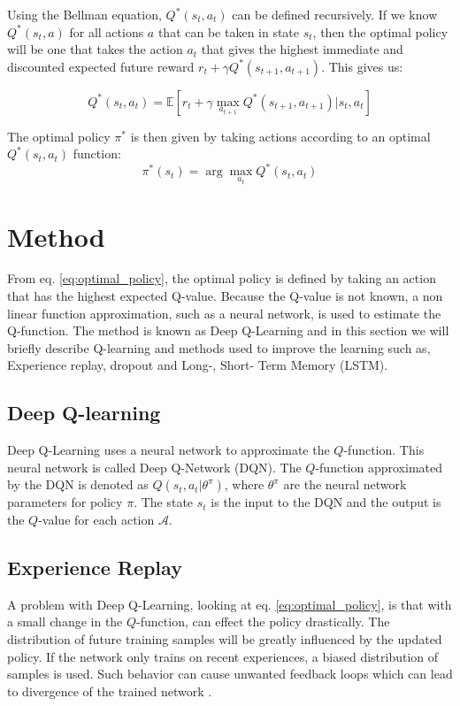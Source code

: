 Using the Bellman equation, $Q^*(s_t, a_t)$ can be defined recursively. If we know $Q^*(s_t, a)$ for all actions $a$ that can be taken in state $s_t$, then the optimal policy will be one that takes the action $a_{t}$ that gives the highest immediate and discounted expected future reward $r_t + \gamma Q^*(s_{t+1}, a_{t+1})$. This gives us: 

\begin{equation}
Q^*(s_t,a_t)= \mathbb{E}[r_t + \gamma \max_{a_{t+1}} Q^*(s_{t+1}, a_{t+1})| s_t, a_t]
\label{eq:q-function}
\end{equation}

The optimal policy $\pi^*$ is then given by taking actions according to an optimal $Q^*(s_t,a_t)$ function: 
\begin{equation}
\pi^*(s_t) = \arg\max_{a_t} Q^*(s_t,a_t)
\label{eq:optimal_policy}
\end{equation}

\section{Method}
\label{sec:method}
From eq. \ref{eq:optimal_policy}, the optimal policy is defined by taking an action that has the highest expected Q-value. Because the Q-value is not known, a non linear function approximation, such as a neural network, is used to estimate the Q-function. The method is known as Deep Q-Learning \cite{Mnih2015} and in this section we will briefly describe Q-learning and methods used to improve the learning such as, Experience replay, dropout and Long-, Short- Term Memory (LSTM).

\subsection{Deep Q-learning}
\label{sec:dqn}
Deep Q-Learning uses a neural network to approximate the $Q$-function. This neural network is called Deep Q-Network (DQN). The $Q$-function approximated by the DQN is denoted as $Q(s_t,a_t|\theta^\pi)$, where $\theta^\pi$ are the neural network parameters for policy $\pi$. The state $s_t$ is the input to the DQN and the output is the $Q$-value for each action $\mathcal{A}$.

\subsection{Experience Replay}
A problem with Deep Q-Learning, looking at eq. \ref{eq:optimal_policy}, is that with a small change in the $Q$-function, can effect the policy drastically. The distribution of future training samples will be greatly influenced by the updated policy. If the network only trains on recent experiences, a biased distribution of samples is used. Such behavior can cause unwanted feedback loops which can lead to divergence of the trained network \cite{Tsitsiklis1997AnApproximation}.

